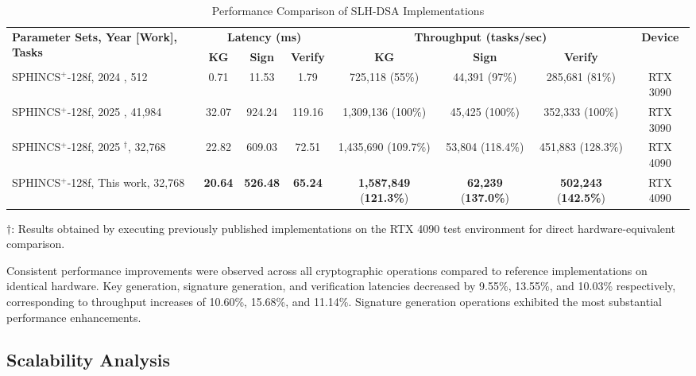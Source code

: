 \documentclass[journal]{IEEEtran}
\begin{document}
\begin{table}[t]
  \centering
  \caption{Performance Comparison of SLH-DSA Implementations}
  \label{tab:comparative_perf}
  \begin{tabular}{@{}lccccccc@{}}
    \toprule
    \multirow{2}{*}{\textbf{Parameter Sets, Year [Work], Tasks}} & \multicolumn{3}{c}{\textbf{Latency (ms)}} & \multicolumn{3}{c}{\textbf{Throughput (tasks/sec)}} & \multirow{2}{*}{\textbf{Device}} \\
    \cmidrule(lr){2-4} \cmidrule(lr){5-7}
    & \textbf{KG} & \textbf{Sign} & \textbf{Verify} & \textbf{KG} & \textbf{Sign} & \textbf{Verify} & \\
    \midrule
    SPHINCS$^+$-128f, 2024 \cite{Kim2024}, 512  & 0.71 & 11.53 & 1.79 & 725,118 (55\%) & 44,391 (97\%) & 285,681 (81\%) & RTX 3090 \\
    SPHINCS$^+$-128f, 2025 \cite{Wang2025}, 41,984 & 32.07 & 924.24 & 119.16 & 1,309,136 (100\%) & 45,425 (100\%) & 352,333 (100\%) & RTX 3090 \\
    SPHINCS$^+$-128f, 2025 \cite{Wang2025}$^\dagger$, 32,768 & 22.82 & 609.03 & 72.51 & 1,435,690 (109.7\%) & 53,804 (118.4\%) & 451,883 (128.3\%) & RTX 4090 \\
    SPHINCS$^+$-128f, This work, 32,768 & \textbf{20.64} & \textbf{526.48} & \textbf{65.24} & \textbf{1,587,849} (\textbf{121.3\%}) & \textbf{62,239} (\textbf{137.0\%}) & \textbf{502,243} (\textbf{142.5\%}) & RTX 4090 \\
    \bottomrule
  \end{tabular}
  \begin{tablenotes}
  \item[] $\dagger$: Results obtained by executing previously published implementations on the RTX 4090 test environment for direct hardware-equivalent comparison.
  \end{tablenotes}
\end{table}

Consistent performance improvements were observed across all cryptographic operations compared to reference implementations on identical hardware. Key generation, signature generation, and verification latencies decreased by 9.55\%, 13.55\%, and 10.03\% respectively, corresponding to throughput increases of 10.60\%, 15.68\%, and 11.14\%. Signature generation operations exhibited the most substantial performance enhancements.

\subsection{Scalability Analysis}
\end{document}
